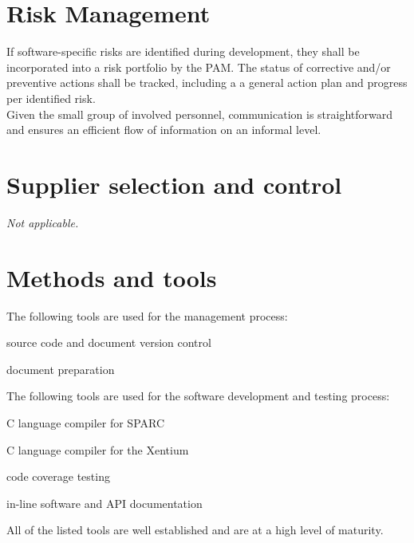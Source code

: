 \section{Risk Management}

If software-specific risks are identified during development, they shall be
incorporated into a risk portfolio by the \gls{PAM}. The status of corrective
and/or preventive actions shall be tracked, including a a general action plan
and progress per identified risk.\\

Given the small group of involved personnel, communication is straightforward
and ensures an efficient flow of information on an informal level.


\section{Supplier selection and control}

\emph{Not applicable.}


\section{Methods and tools}

The following tools are used for the management process:

\begin{description}[labelwidth=4em,leftmargin=\parindent,labelindent=\parindent]
	\item[\textbf{git}]		source code and document version control
	\item[\textbf{TeX Live}]	document preparation
\end{description}


\noindent
The following tools are used for the software development and testing process:

\begin{description}[labelwidth=4em,leftmargin=\parindent,labelindent=\parindent]
	\item[\textbf{sparc-gcc}]	C language compiler for \gls{SPARC}
	\item[\textbf{xentium-clang}]	C language compiler for the \gls{Xentium}
	\item[\textbf{gcov}]		code coverage testing
	\item[\textbf{doxygen}]		in-line software and \gls{API} documentation
\end{description}

\noindent
All of the listed tools are well established and are at a high level of maturity.


